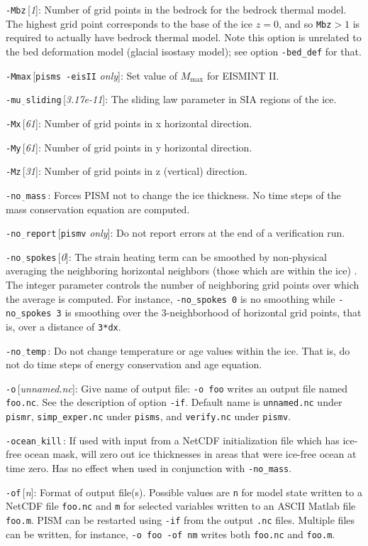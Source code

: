 \documentclass[11pt,final]{amsart}
\renewcommand{\t}[1]{\texttt{#1}}
\newcommand{\rawopt}[1]{\vspace{1mm}\noindent \large\texttt{-#1}\normalsize}
\newcommand{\opt}[1]{\rawopt{#1}\,:\quad}
\newcommand{\optdef}[2]{\rawopt{#1}\,[\textsl{#2}]:\quad}
\newcommand{\optrestrict}[2]{\rawopt{#1}\,[\texttt{#2} \textsl{only}]:\quad}
\newcommand{\und}{$\underline{\,\,\,}$}
\begin{document}
\optdef{Mbz}{1}  Number of grid points in the bedrock for the bedrock thermal model.  The highest grid point corresponds to the base of the ice $z=0$, and so \t{Mbz}$>1$ is required to actually have bedrock thermal model.  Note this option is unrelated to the bed deformation model (glacial isostasy model); see option \verb|-bed_def| for that.

\optrestrict{Mmax}{pisms -eisII}  Set value of $M_{\text{max}}$ for EISMINT II.

\optdef{mu\und sliding}{3.17e-11}  The sliding law parameter in SIA regions of the ice.

\optdef{Mx}{61}  Number of grid points in x horizontal direction.

\optdef{My}{61}  Number of grid points in y horizontal direction.

\optdef{Mz}{31}  Number of grid points in z (vertical) direction.

\opt{no\und mass}  Forces PISM not to change the ice thickness.  No time steps of the mass conservation equation are computed.

\optrestrict{no\und report}{pismv}  Do not report errors at the end of a verification run.

\optdef{no\und spokes}{0}  The strain heating term can be smoothed by non-physical averaging the neighboring horizontal neighbors (those which are within the ice) \cite{BBL}.  The integer parameter controls the number of neighboring grid points over which the average is computed.  For instance, \verb|-no_spokes 0| is no smoothing while \verb|-no_spokes 3| is smoothing over the 3-neighborhood of horizontal grid points, that is, over a distance of \verb|3*dx|.

\opt{no\und temp}  Do not change temperature or age values within the ice.  That is, do not do time steps of energy conservation and age equation.

\optdef{o}{unnamed.nc} Give name of output file: \verb|-o foo| writes an output file named \verb|foo.nc|.  See the description of option \verb|-if|.  Default name is \verb|unnamed.nc| under \verb|pismr|, \verb|simp_exper.nc| under \verb|pisms|, and \verb|verify.nc| under \verb|pismv|.

\opt{ocean\und kill}  If used with input from a NetCDF initialization file which has ice-free ocean mask, will zero out ice thicknesses in areas that were ice-free ocean at time zero.  Has no effect when used in conjunction with \verb|-no_mass|.

\optdef{of}{n}  Format of output file(s).  Possible values are \verb|n| for model state written to a NetCDF file \verb|foo.nc| and \verb|m| for selected variables written to an ASCII Matlab file \verb|foo.m|.  PISM can be restarted using \verb|-if| from the output \verb|.nc| files.  Multiple files can be written, for instance, \verb|-o foo -of nm| writes both \verb|foo.nc| and \verb|foo.m|.
\end{document}

